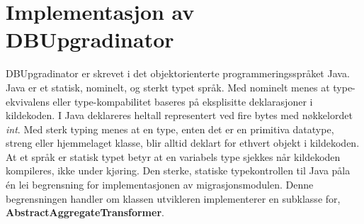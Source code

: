 \section{Implementasjon av DBUpgradinator}

DBUpgradinator er skrevet i det objektorienterte programmeringsspråket Java. Java er et statisk, nominelt, og sterkt typet språk. Med nominelt menes at type-ekvivalens eller type-kompabilitet baseres på eksplisitte deklarasjoner i kildekoden. I Java deklareres heltall representert ved fire bytes med nøkkelordet \emph{int}. Med sterk typing menes at en type, enten det er en primitiva datatype, streng eller hjemmelaget klasse, blir alltid deklart for ethvert objekt i kildekoden. At et språk er statisk typet betyr at en variabels type sjekkes når kildekoden kompileres, ikke under kjøring. Den sterke, statiske typekontrollen til Java påla én lei begrensning for implementasjonen av migrasjonsmodulen. Denne begrensningen handler om klassen utvikleren implementerer en subklasse for, \textbf{AbstractAggregateTransformer}.
\newpage

